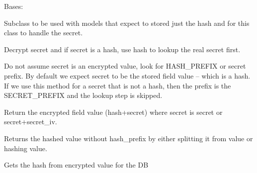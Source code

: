 \documentclass[letterpaper,10pt,english]{sphinxmanual}
\begin{document}
\begin{fulllineitems}
\label{base_classes:bhp_crypto.classes.FieldCryptor}
Bases: 

Subclass to be used with models that expect to stored just the hash and for this class to handle the secret.

\begin{fulllineitems}
\label{base_classes:bhp_crypto.classes.FieldCryptor.decrypt}
Decrypt secret and if secret is a hash, use hash to lookup the real secret first.

Do not assume secret is an encrypted value, look for HASH\_PREFIX or secret prefix.
By default we expect secret to be the stored field value -- which is a hash.
If we use this method for a secret that is not a hash, then the prefix is
the SECRET\_PREFIX and the lookup step is skipped.

\end{fulllineitems}


\begin{fulllineitems}
\label{base_classes:bhp_crypto.classes.FieldCryptor.encrypt}
Return the encrypted field value (hash+secret) where secret is secret or secret+secret\_iv.

\end{fulllineitems}


\begin{fulllineitems}
\label{base_classes:bhp_crypto.classes.FieldCryptor.get_hash}
Returns the hashed value without hash\_prefix by either splitting it from value or hashing value.

\end{fulllineitems}


\begin{fulllineitems}
\label{base_classes:bhp_crypto.classes.FieldCryptor.get_prep_value}
Gets the hash from encrypted value for the DB


\end{fulllineitems}
\end{fulllineitems}
\end{document}
